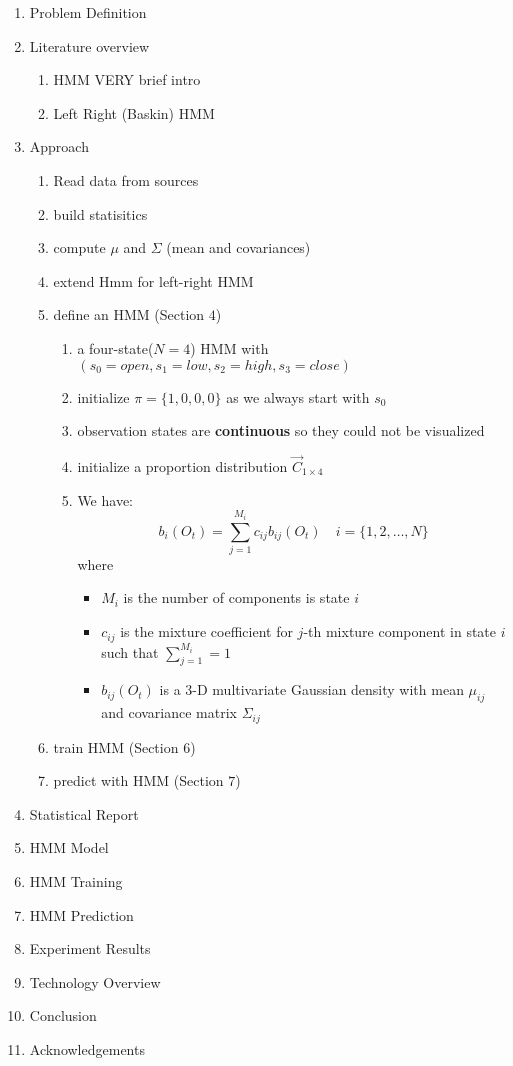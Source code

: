 \documentclass{acm_proc_article-sp}
\begin{document}
\begin{enumerate}
  \item Problem Definition
  \item Literature overview
  \begin{enumerate}
    \item HMM VERY brief intro
    \item Left Right (Baskin) HMM
  \end{enumerate}
  \item Approach
  \begin{enumerate}
    \item Read data from sources
    \item build statisitics
    \item compute $\mu$ and $\Sigma$ (mean and covariances)
    \item extend Hmm for left-right HMM
    \item define an HMM (Section $4$)
    \begin{enumerate}
      \item a four-state($N = 4$) HMM with $(s_0 = open, s_1 = low, s_2 = high, s_3 = close)$
      \item initialize $\pi = \{1, 0, 0, 0\}$ as we always start with $s_0$
      \item observation states are \textbf{continuous} so they could not be visualized
      \item initialize a proportion distribution $\vec{C}_{1 \times 4}$
      \item We have:
      \begin{equation}
      b_i(O_t) = \sum_{j=1}^{M_i} c_{ij}b_{ij}(O_t) \quad i = \{1, 2, \ldots, N\}
      \end{equation}
	  where
	  \begin{itemize}
        \item $M_i$ is the number of components is state $i$
        \item $c_{ij}$ is the mixture coefficient for $j$-th mixture component in state $i$ such that $\sum_{j=1}^{M_i}
        = 1$
        \item $b_{ij}(O_t)$ is a $3$-D multivariate Gaussian density with mean $\mu_{ij}$ and covariance matrix
        $\Sigma_{ij}$
      \end{itemize}
    \end{enumerate}
    \item train HMM (Section $6$)
    \item predict with HMM (Section $7$)
  \end{enumerate}
  \item Statistical Report
  \item HMM Model
  \item HMM Training
  \item HMM Prediction
  \item Experiment Results
  \item Technology Overview
  \item Conclusion
  \item Acknowledgements
\end{enumerate}
\end{document}

